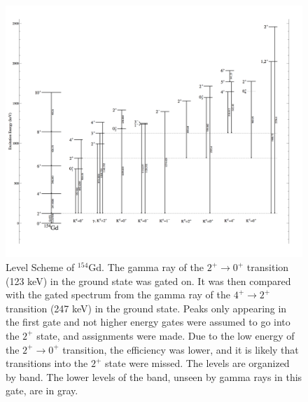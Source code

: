 \begin{figure}[!]
    \centering
    \includegraphics[scale=0.18]{154GdTablesAndFigs/154Gd_2to0.png}
    \caption{Level Scheme of $^{154}$Gd. The gamma ray of the $2^+\rightarrow0^+$ transition (123 keV) in the ground state was gated on. It was then compared with the gated spectrum from the gamma ray of the $4^+\rightarrow2^+$ transition (247 keV) in the ground state. Peaks only appearing in the first gate and not higher energy gates were assumed to go into the $2^+$ state, and assignments were made. Due to the low energy of the $2^+\rightarrow0^+$ transition, the efficiency was lower, and it is likely that transitions into the $2^+$ state were missed. The levels are organized by band. The lower levels of the band, unseen by gamma rays in this gate, are in gray.}
    \label{fig:154_2to0}
\end{figure}